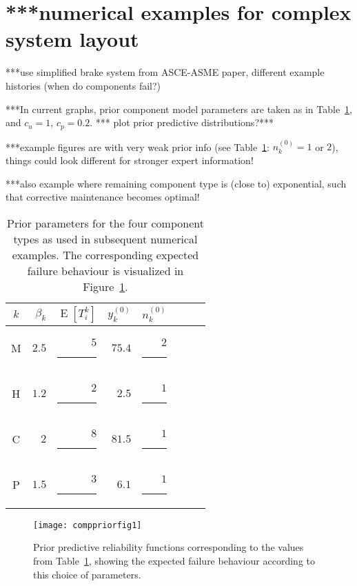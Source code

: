 \documentclass[authoryear]{elsarticle}
\newcommand{\uz}{^{(0)}} %
\newcommand{\E}{\operatorname{E}}
\def\ykz{y\uz_k}
\def\nkz{n\uz_k}
\begin{document}
\section{***numerical examples for complex system layout}
\label{sec:examples}

***use simplified brake system from ASCE-ASME paper,
different example histories (when do components fail?)

***In current graphs,
prior component model parameters are taken as in Table~\ref{tab:priorparams},
and $c_u = 1$, $c_p = 0.2$. *** plot prior predictive distributions?***

***example figures are with very weak prior info
(see Table~\ref{tab:priorparams}: $\nkz = 1$ or $2$),
things could look different for stronger expert information!

***also example where remaining component type is (close to) exponential,
such that corrective maintenance becomes optimal!

\begin{table}
\centering
\begin{tabular}{crrrrrrr}
  \toprule
$k$ & $\beta_k$ & $\E[T_i^k]$ & $\ykz$ & $\nkz$ \\
  \midrule
M & $2.5$ & $5$\rule{1.5ex}{0ex} & $75.4$ & $2$\rule{1ex}{0ex} \\
H & $1.2$ & $2$\rule{1.5ex}{0ex} & $ 2.5$ & $1$\rule{1ex}{0ex} \\
C & $2  $ & $8$\rule{1.5ex}{0ex} & $81.5$ & $1$\rule{1ex}{0ex} \\
P & $1.5$ & $3$\rule{1.5ex}{0ex} & $ 6.1$ & $1$\rule{1ex}{0ex} \\
  \bottomrule
\end{tabular}
\caption{Prior parameters for the four component types as used in subsequent numerical examples.
The corresponding expected failure behaviour is visualized in Figure~\ref{fig:comppriorfig1}.}
\label{tab:priorparams}
\end{table}

\begin{figure}
\centering
\texttt{[image: comppriorfig1]}
\caption{Prior predictive reliability functions corresponding to the values from Table~\ref{tab:priorparams},
showing the expected failure behaviour according to this choice of parameters.}
\label{fig:comppriorfig1}
\end{figure}
\end{document}
